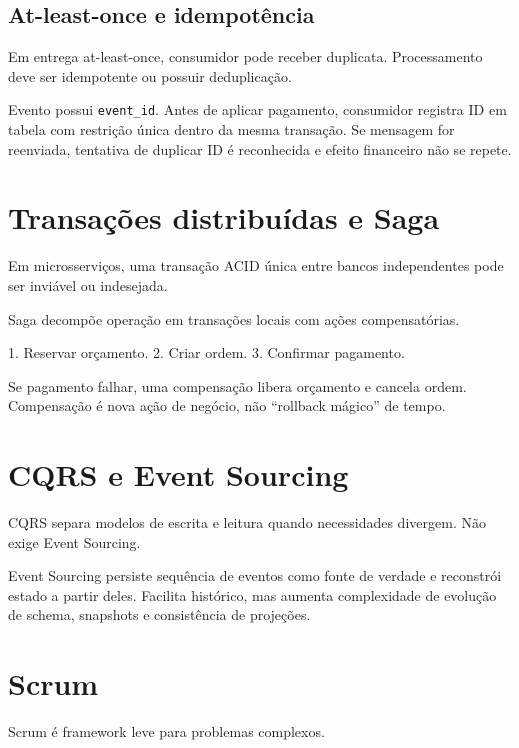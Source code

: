 \subsection{At-least-once e idempotência}

Em entrega at-least-once, consumidor pode receber duplicata. Processamento deve ser idempotente ou possuir deduplicação.

\begin{exemplo}[deduplicação]
Evento possui \texttt{event_id}. Antes de aplicar pagamento, consumidor registra ID em tabela com restrição única dentro da mesma transação. Se mensagem for reenviada, tentativa de duplicar ID é reconhecida e efeito financeiro não se repete.
\end{exemplo}

\section{Transações distribuídas e Saga}

Em microsserviços, uma transação ACID única entre bancos independentes pode ser inviável ou indesejada.

Saga decompõe operação em transações locais com ações compensatórias.

\begin{example}[saga]
1. Reservar orçamento. 2. Criar ordem. 3. Confirmar pagamento.

Se pagamento falhar, uma compensação libera orçamento e cancela ordem. Compensação é nova ação de negócio, não ``rollback mágico'' de tempo.
\end{example}

\section{CQRS e Event Sourcing}

CQRS separa modelos de escrita e leitura quando necessidades divergem. Não exige Event Sourcing.

Event Sourcing persiste sequência de eventos como fonte de verdade e reconstrói estado a partir deles. Facilita histórico, mas aumenta complexidade de evolução de schema, snapshots e consistência de projeções.

\section{Scrum}

Scrum é framework leve para problemas complexos.

